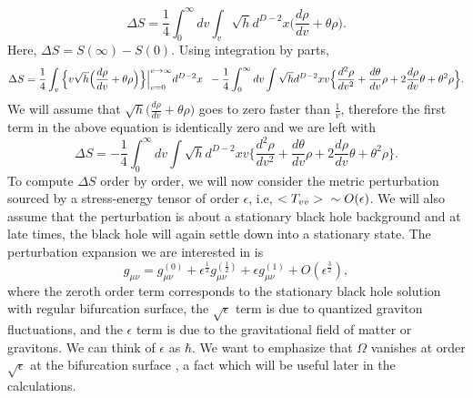 \documentclass[12pt]{article}
\begin{document}
\begin{equation}\label{I4}
\Delta S=  \frac{1}{4} \int_{0}^{\infty} dv \int_v \sqrt{h} d^{D-2}x \Big(\frac{d\rho}{dv} +\theta \rho\Big).
\end{equation}
Here, $\Delta S= S(\infty)-S(0)$. Using integration by parts,
\begin{equation}\label{I5}
\Delta S = \frac{1}{4}\int_v \Big \{ v \sqrt{h}  \Big(\frac{d\rho}{dv} +\theta \rho\Big)\Big\} \Big|_{v=0}^{v \rightarrow \infty} d^{D-2}x \hspace{2mm} - \frac{1}{4} \int_{0}^{\infty} dv \int \sqrt{h} d^{D-2}x v \Big \{\frac{d^2 \rho}{dv^2} + \frac{d\theta}{dv}\rho + 2 \frac{d \rho}{dv}\theta +\theta ^2 \rho \Big \}.
\end{equation}
We will assume that $\sqrt{h}  \Big(\frac{d\rho}{dv} +\theta \rho\Big)$ goes to zero faster than $\frac{1}{v}$, therefore the first term in the above equation is identically zero and we are left with
\begin{equation}\label{I6}
\Delta S = - \frac{1}{4} \int_{0}^{\infty} dv \int \sqrt{h} d^{D-2}x v \Big \{\frac{d^2 \rho}{dv^2} + \frac{d\theta}{dv}\rho + 2 \frac{d \rho}{dv}\theta +\theta ^2 \rho \Big \}.
\end{equation}
To compute $\Delta S $ order by order, we will now consider the metric perturbation sourced by a stress-energy tensor of order $\epsilon$, i.e,  $<T_{vv}> \hspace{2mm}\sim O(\epsilon)$. We will also assume that the perturbation is about a stationary black hole background and at late times, the black hole will again settle down into a stationary state. The perturbation expansion we are interested in is
\begin{equation}\label{I7}
g_{\mu \nu}= g^{(0)}_{\mu \nu} + \epsilon^{\frac{1}{2}} g^{(\frac{1}{2})}_{\mu \nu}+
\epsilon g^{(1)}_{\mu \nu}+ O(\epsilon^{\frac{3}{2}}),
\end{equation}
where the zeroth order term corresponds to the stationary black hole solution with regular bifurcation surface, the $\sqrt{\epsilon}$ term is due to quantized graviton fluctuations, and the $\epsilon$ term is due to the
gravitational field of matter or gravitons. We can think of $\epsilon$ as $\hbar$. We want to emphasize that  $\Omega$  vanishes at order $\sqrt{\epsilon}$ at the bifurcation surface \cite{AS}, a fact which will be useful later in the calculations.
\end{document}
